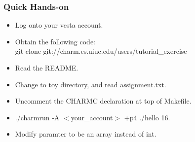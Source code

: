 \begin{frame}[fragile]
  \frametitle{Quick Hands-on}
  \begin{itemize}
  \item Log onto your vesta account.
  \item Obtain the following code:\\ git clone git://charm.cs.uiuc.edu/users/tutorial\_exercise
  \item Read the README.
  \item Change to toy directory, and read assignment.txt.
  \item Uncomment the CHARMC declaration at top of Makefile.
  \item ./charmrun -A $<$your\_account$>$ +p4 ./hello 16.
  \item Modify paramter to be an array instead of int.
  \end{itemize}
\end{frame}

